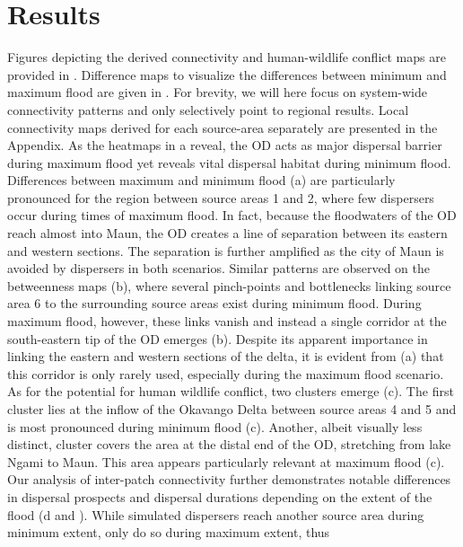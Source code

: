 \documentclass[abstract=on,10pt,a4paper,bibliography=totocnumbered]{article}
\begin{document}
\section{Results}
Figures depicting the derived connectivity and human-wildlife conflict maps are
provided in . Difference maps to visualize the differences between
minimum and maximum flood are given in . For brevity, we will
here focus on system-wide connectivity patterns and only selectively point to
regional results. Local connectivity maps derived for each source-area
separately are presented in the Appendix. As the heatmaps in a
reveal, the OD acts as major dispersal barrier during maximum flood yet reveals
vital dispersal habitat during minimum flood. Differences between maximum and
minimum flood (a) are particularly pronounced for the region
between source areas 1 and 2, where few dispersers occur during times of maximum
flood. In fact, because the floodwaters of the OD reach almost into Maun, the OD
creates a line of separation between its eastern and western sections. The
separation is further amplified as the city of Maun is avoided by dispersers in
both scenarios. Similar patterns are observed on the betweenness maps
(b), where several pinch-points and bottlenecks linking source
area 6 to the surrounding source areas exist during minimum flood. During
maximum flood, however, these links vanish and instead a single corridor at the
south-eastern tip of the OD emerges (b). Despite its apparent
importance in linking the eastern and western sections of the delta, it is
evident from (a) that this corridor is only rarely used,
especially during the maximum flood scenario. As for the potential for human
wildlife conflict, two clusters emerge (c). The first cluster lies
at the inflow of the Okavango Delta between source areas 4 and 5 and is most
pronounced during minimum flood (c). Another, albeit visually
less distinct, cluster covers the area at the distal end of the OD, stretching
from lake Ngami to Maun. This area appears particularly relevant at maximum
flood (c). Our analysis of inter-patch connectivity further
demonstrates notable differences in dispersal prospects and dispersal durations
depending on the extent of the flood (d and ).
While  simulated dispersers reach
another source area during minimum extent, only
 do so during maximum extent, thus
\end{document}
